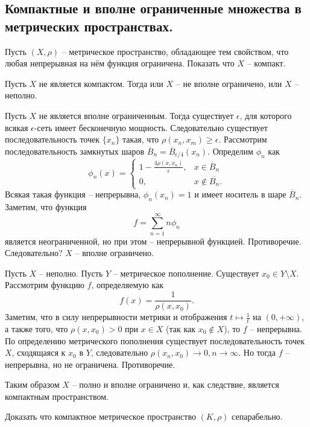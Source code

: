 \subsection{Компактные и вполне ограниченные множества в метрических пространствах.}
\begin{task}[\S 3.4]
    Пусть $(X, \rho)$ -- метрическое пространство, обладающее тем свойством, что любая непрерывная на нём функция ограничена. Показать что $X$ -- компакт.
\end{task}
\begin{solve}
    Пусть $X$ не является компактом. Тогда или $X$ -- не вполне ограничено, или $X$ -- неполно.

    Пусть $X$ не является вполне ограниченным. Тогда существует $\epsilon$, для которого всякая $\epsilon$-сеть имеет бесконечную мощность. Следовательно существует последовательность точек $\{x_n\}$ такая, что $\rho(x_n, x_m) \geq \epsilon$. Рассмотрим последовательность замкнутых шаров $\overline{B}_n = \overline{B}_{\epsilon/4}(x_n)$. Определим $\phi_n$ как
    \[
        \phi_n(x) =
        \begin{cases}
            1 - \frac{4\rho(x, x_n)}{\epsilon}, & x \in \overline{B}_n \\
            0, & x \notin \overline{B_n}.
        \end{cases}
    \]
    Всякая такая функция -- непрерывна, $\phi_n(x_n) = 1$ и имеет носитель в шаре $\overline{B}_n$. Заметим, что функция
    \[
        f = \sum_{n = 1}^{\infty} n\phi_n
    \]
    является неограниченной, но при этом -- непрерывной функцией. Противоречие. Следовательно? $X$ -- вполне ограничено.

    Пусть $X$ -- неполно. Пусть $Y$ -- метрическое пополнение. Существует $x_0 \in Y \setminus X$. Рассмотрим функцию $f$, определяемую как
    \[
        f(x) = \frac{1}{\rho(x, x_0)}.
    \]
    Заметим, что в силу непрерывности метрики и отображения $t \mapsto \frac{1}{t}$ на $(0, +\infty)$, а также того, что $\rho(x, x_0) > 0$ при $x \in X$ (так как $x_0 \notin X$), то $f$ -- непрерывна. По определению метрического пополнения существует последовательность точек $X$, сходящаяся к $x_0$ в $Y$, следовательно $\rho(x_n, x_0) \rightarrow 0, n \rightarrow \infty$. Но тогда $f$ -- непрерывна, но не ограничена. Противоречие.

    Таким образом $X$ -- полно и вполне ограничено и, как следствие, является компактным пространством.
\end{solve}
\begin{task}[\S 3.8]
    Доказать что компактное метрическое пространство $(K, \rho)$ сепарабельно.
\end{task}
